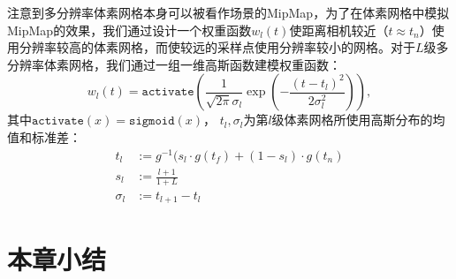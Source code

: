 注意到多分辨率体素网格本身可以被看作场景的MipMap，为了在体素网格中模拟MipMap的效果，我们通过设计一个权重函数$w_l(t)$使距离相机较近（$t\approx t_n$）使用分辨率较高的体素网格，而使较远的采样点使用分辨率较小的网格。对于$L$级多分辨率体素网格，我们通过一组一维高斯函数建模权重函数：
\begin{equation}
    w_l(t) = \mathtt{activate}(\frac{1}{\sqrt{2\pi}\sigma_l}\exp(-\frac{(t-t_l)^2}{2\sigma_l^2})),
\end{equation}
其中$\mathtt{activate}(x) = \mathtt{sigmoid}(x)$， $t_l, \sigma_l$为第$l$级体素网格所使用高斯分布的均值和标准差：
\begin{align}
    t_l &:= g^{-1}(s_l\cdot g(t_f) + (1-s_l)\cdot g(t_n)\\
    s_l &:= \frac{l + 1}{1 + L}\\
    \sigma_l &:= t_{l+1} - t_{l}
\end{align}


\section{本章小结}